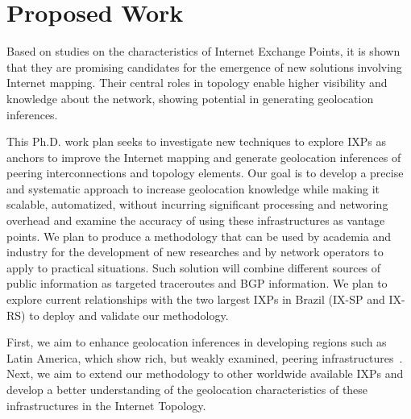 \chapter{Proposed Work}\label{cap:proposal}
\thispagestyle{empty}


	Based on studies on the characteristics of Internet Exchange Points, it is shown that they are promising candidates for the emergence of new solutions involving Internet mapping. Their central roles in topology enable higher visibility and knowledge about the network, showing potential in generating geolocation inferences.

	This Ph.D. work plan seeks to investigate new techniques to explore IXPs as anchors to improve the Internet mapping and generate geolocation inferences of peering interconnections and topology elements. Our goal is to develop a precise and systematic approach to increase geolocation knowledge while making it scalable, automatized, without incurring significant processing and networing overhead and examine the accuracy of using these infrastructures as vantage points. We plan to produce a methodology that can be used by academia and industry for the development of new researches and by network operators to apply to practical situations. Such solution will combine different sources of public information as targeted traceroutes and BGP information. We plan to explore current relationships with the two largest IXPs in Brazil (IX-SP and IX-RS) to deploy and validate our methodology.

	First, we aim to enhance geolocation inferences in developing regions such as Latin America, which show rich, but weakly examined, peering infrastructures~\cite{IXbr, DissectingBrazilianIXP}. Next, we aim to extend our methodology to other worldwide available IXPs and develop a better understanding of the geolocation characteristics of these infrastructures in the Internet Topology.

